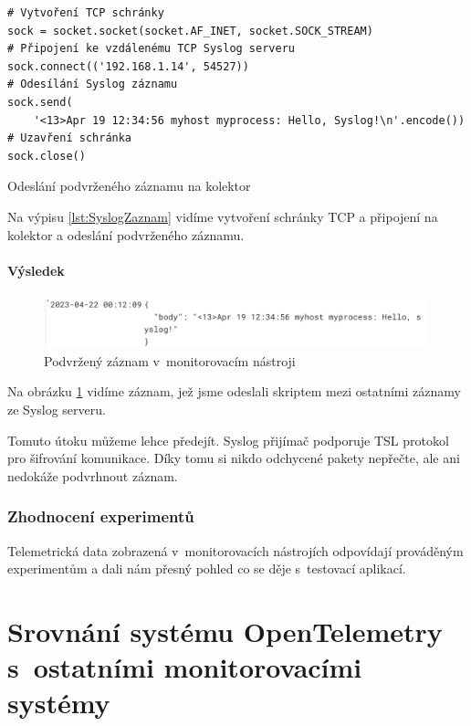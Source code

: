 \begin{listing}[H]
    \begin{verbatim}
# Vytvoření TCP schránky
sock = socket.socket(socket.AF_INET, socket.SOCK_STREAM)
# Připojení ke vzdálenému TCP Syslog serveru
sock.connect(('192.168.1.14', 54527))
# Odesílání Syslog záznamu
sock.send(
    '<13>Apr 19 12:34:56 myhost myprocess: Hello, Syslog!\n'.encode())
# Uzavření schránka
sock.close()
\end{verbatim}
    \caption{Odeslání podvrženého záznamu na kolektor}
    \label{lst:SyslogZaznam}
\end{listing}

Na výpisu \ref{lst:SyslogZaznam} vidíme vytvoření schránky TCP a připojení na kolektor a odeslání podvrženého záznamu.

\subsubsection{Výsledek}

 \begin{figure}[H]
  \centering
  \includegraphics[width=15cm]{obrazky-figures/SyslogMes.png}
  \caption{Podvržený záznam v~monitorovacím nástroji}
  \label{fig:podvrh}
\end{figure}

Na obrázku \ref{fig:podvrh} vidíme záznam, jež jsme odeslali skriptem mezi ostatními záznamy ze Syslog serveru. 

Tomuto útoku můžeme lehce předejít. Syslog přijímač podporuje TSL protokol pro šifrování komunikace. Díky tomu si nikdo odchycené pakety nepřečte, ale ani nedokáže podvrhnout záznam.


\subsection{Zhodnocení experimentů}

Telemetrická data zobrazená v~monitorovacích nástrojích odpovídají prováděným experimentům a dali nám přesný pohled co se děje s~testovací aplikací. 


\chapter{Srovnání systému OpenTelemetry s~ostatními monitorovacími systémy}

